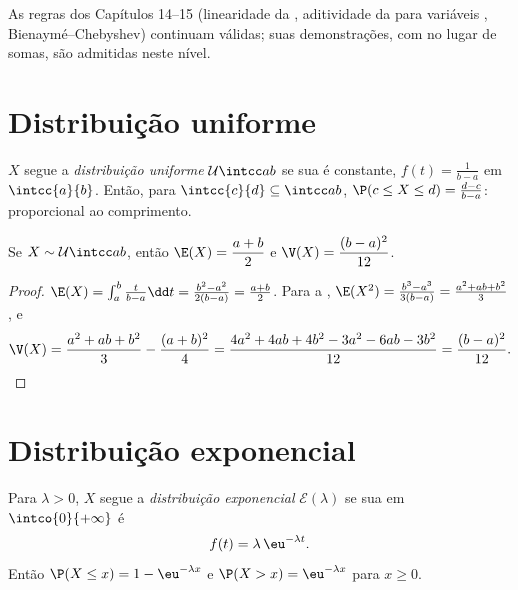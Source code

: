 As regras dos Capítulos 14--15 (linearidade da , aditividade da
 para variáveis , Bienaymé--Chebyshev) continuam
válidas; suas demonstrações, com  no lugar de somas, são
admitidas neste nível.

\section{Distribuição uniforme}

\begin{definition}\label{def:g12:contdist:uniform}
$X$ segue a \emph{distribuição uniforme}
$\mathcal U\intcc ab$ se sua  é constante,
$f(t) = \frac{1}{b-a}$ em $\intcc{a}{b}$. Então, para
$\intcc{c}{d} \subseteq \intcc ab$,
$\P(c \leq X \leq d) = \frac{d - c}{b - a}$:  proporcional ao
comprimento.
\end{definition}

\begin{proposition}\label{prop:g12:contdist:uniformmoments}
Se $X \sim \mathcal U\intcc ab$, então
$\E(X) = \dfrac{a+b}{2}$ e $\V(X) = \dfrac{(b-a)^2}{12}$.
\end{proposition}

\begin{proof}
$\E(X) = \int_a^b \frac{t}{b-a}\dd t
= \frac{b^2 - a^2}{2(b-a)} = \frac{a+b}{2}$. Para a ,
$\E(X^2) = \frac{b^3 - a^3}{3(b-a)} = \frac{a^2 + ab + b^2}{3}$, e
\[
\V(X) = \frac{a^2 + ab + b^2}{3} - \frac{(a+b)^2}{4}
= \frac{4a^2 + 4ab + 4b^2 - 3a^2 - 6ab - 3b^2}{12}
= \frac{(b - a)^2}{12}. \qedhere
\]
\end{proof}

\section{Distribuição exponencial}

\begin{definition}\label{def:g12:contdist:expo}
Para $\lambda > 0$, $X$ segue a \emph{distribuição
exponencial} $\mathcal E(\lambda)$ se sua
 em $\intco{0}{+\infty}$ é
\[
f(t) = \lambda\,\eu^{-\lambda t}.
\]
Então $\P(X \leq x) = 1 - \eu^{-\lambda x}$ e
$\P(X > x) = \eu^{-\lambda x}$ para $x \geq 0$.
\end{definition}

